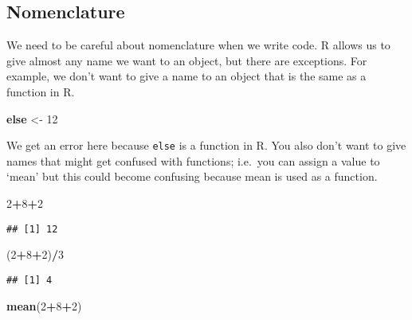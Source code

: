 \documentclass[
]{article}
\newenvironment{Shaded}{\begin{snugshade}}{\end{snugshade}}
\newcommand{\ControlFlowTok}[1]{\textcolor[rgb]{0.13,0.29,0.53}{\textbf{#1}}}
\newcommand{\DecValTok}[1]{\textcolor[rgb]{0.00,0.00,0.81}{#1}}
\newcommand{\FunctionTok}[1]{\textcolor[rgb]{0.13,0.29,0.53}{\textbf{#1}}}
\newcommand{\NormalTok}[1]{#1}
\newcommand{\OtherTok}[1]{\textcolor[rgb]{0.56,0.35,0.01}{#1}}
\newcommand{\SpecialCharTok}[1]{\textcolor[rgb]{0.81,0.36,0.00}{\textbf{#1}}}
\begin{document}
\hypertarget{nomenclature}{%
\subsection{Nomenclature}\label{nomenclature}}

We need to be careful about nomenclature when we write code. R allows us
to give almost any name we want to an object, but there are exceptions.
For example, we don't want to give a name to an object that is the same
as a function in R.

\begin{Shaded}
\begin{Highlighting}[]
\ControlFlowTok{else} \OtherTok{\textless{}{-}} \DecValTok{12}
\end{Highlighting}
\end{Shaded}

We get an error here because \texttt{else} is a function in R. You also
don't want to give names that might get confused with functions;
i.e.~you can assign a value to `mean' but this could become confusing
because mean is used as a function.

\begin{Shaded}
\begin{Highlighting}[]
\DecValTok{2}\SpecialCharTok{+}\DecValTok{8}\SpecialCharTok{+}\DecValTok{2}
\end{Highlighting}
\end{Shaded}

\begin{verbatim}
## [1] 12
\end{verbatim}

\begin{Shaded}
\begin{Highlighting}[]
\NormalTok{(}\DecValTok{2}\SpecialCharTok{+}\DecValTok{8}\SpecialCharTok{+}\DecValTok{2}\NormalTok{)}\SpecialCharTok{/}\DecValTok{3}
\end{Highlighting}
\end{Shaded}

\begin{verbatim}
## [1] 4
\end{verbatim}

\begin{Shaded}
\begin{Highlighting}[]
\FunctionTok{mean}\NormalTok{(}\DecValTok{2}\SpecialCharTok{+}\DecValTok{8}\SpecialCharTok{+}\DecValTok{2}\NormalTok{)}
\end{Highlighting}
\end{Shaded}
\end{document}
